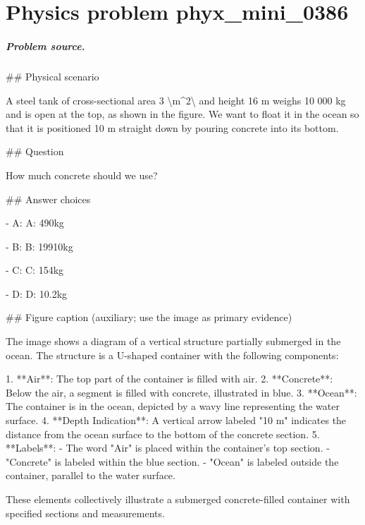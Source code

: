 
\chapter{Physics problem phyx\_mini\_0386}
\label{ch:PhyXMiniProblems_problem_phyx_mini_0386}

\paragraph{Problem source.}
\#\# Physical scenario

A steel tank of cross-sectional area 3 \textbackslash{}m\textasciicircum{}2\textbackslash{} and height 16 m weighs 10 000 kg and is open at the top, as shown in the figure. We want to float it in the ocean so that it is positioned 10 m straight down by pouring concrete into its bottom.

\#\# Question

How much concrete should we use?

\#\# Answer choices

- A: A: 490kg

- B: B: 19910kg

- C: C: 154kg

- D: D: 10.2kg

\#\# Figure caption (auxiliary; use the image as primary evidence)

The image shows a diagram of a vertical structure partially submerged in the ocean. The structure is a U-shaped container with the following components:

1. **Air**: The top part of the container is filled with air.
2. **Concrete**: Below the air, a segment is filled with concrete, illustrated in blue.
3. **Ocean**: The container is in the ocean, depicted by a wavy line representing the water surface.
4. **Depth Indication**: A vertical arrow labeled "10 m" indicates the distance from the ocean surface to the bottom of the concrete section.
5. **Labels**:
   - The word "Air" is placed within the container's top section.
   - "Concrete" is labeled within the blue section.
   - "Ocean" is labeled outside the container, parallel to the water surface. 

These elements collectively illustrate a submerged concrete-filled container with specified sections and measurements.

